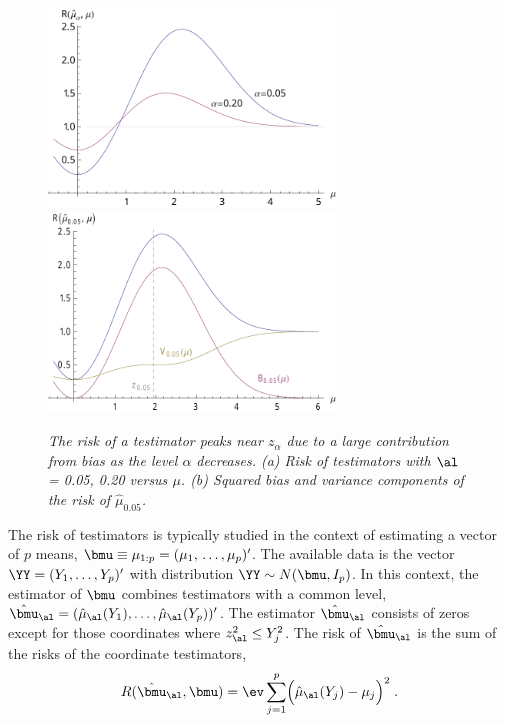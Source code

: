 \documentclass{gSCS2e}
\begin{document}
 \begin{figure}
 \caption{ \label{fig:risk} \sl The risk of a testimator peaks near $z_\alpha$ due to a
 large contribution from bias as the level $\alpha$ decreases. (a) Risk of testimators
 with $\al$ = 0.05, 0.20 versus $\mu$. (b) Squared bias and variance components of the
 risk of $\hat\mu_{0.05}$. }
 \vspace{0.1in}
\centerline{
 \includegraphics[width=3.0in]{figures/risk_a}
 \includegraphics[width=3.0in]{figures/risk_b} }
 \vspace{0.2in}
 \end{figure}
 

 The risk of testimators is typically studied in the context of estimating a vector of $p$
 means, $\bmu \equiv \mu_{1:p} = (\mu_1, \,\ldots, \mu_p)'$.  The available data is the
 vector $\YY = (Y_1, \ldots, Y_p)'$ with distribution $\YY \sim N(\bmu,I_p)$.  In this
 context, the estimator of $\bmu$ combines testimators with a common level,
 $\hat{\bmu}_\al = (\hat\mu_\al(Y_1), \ldots, \hat\mu_\al(Y_p))'$.  The estimator
 $\hat{\bmu}_\al$ consists of zeros except for those coordinates where $z_\al^2 \le
 Y_j^2$.  The risk of $\hat{\bmu}_\al$ is the sum of the risks of the coordinate
 testimators,
 \begin{equation}
    R(\hat{\bmu}_\al, \bmu) 
      = \ev \sum_{j=1}^p \Bigl( \hat{\mu}_{\al}(Y_j) - \mu_j \Bigr)^2 \;.
 \label{eq:risk}
 \end{equation}
\end{document}
